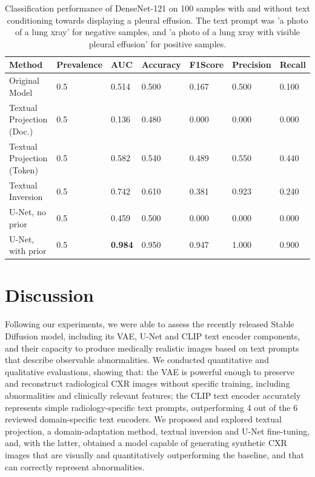 \documentclass{article}
\begin{document}
\begin{table}[]
\centering
\caption{Classification performance of DenseNet-121 on 100 samples with and without text conditioning towards displaying a pleural effusion. The text prompt was 'a photo of a lung xray' for negative samples, and 'a photo of a lung xray with visible pleural effusion' for positive samples.}
\label{table-generated-classification}
\begin{tabular}{@{}lllllll@{}}
\toprule
Method                      & Prevalence & AUC & Accuracy & F1Score & Precision & Recall \\ \midrule
Original Model               & 0.5        & 0.514 & 0.500    & 0.167   & 0.500     & 0.100  \\
Textual Projection (Doc.) & 0.5        & 0.136 & 0.480    & 0.000   & 0.000     & 0.000  \\
Textual Projection (Token) & 0.5        & 0.582 & 0.540    & 0.489   & 0.550     & 0.440  \\
Textual Inversion            & 0.5        & 0.742 & 0.610    & 0.381   & 0.923     & 0.240  \\
U-Net, no prior         & 0.5        & 0.459 & 0.500    & 0.000   & 0.000     & 0.000  \\
U-Net, with prior       & 0.5        & \textbf{0.984} & 0.950    & 0.947   & 1.000     & 0.900  \\ \bottomrule
\end{tabular}
\end{table}

\section{Discussion}

Following our experiments, we were able to assess the recently released Stable Diffusion model, including its VAE, U-Net and CLIP text encoder components, and their capacity to produce medically realistic images based on text prompts that describe observable abnormalities. We conducted quantitative and qualitative evaluations, showing that: the VAE is powerful enough to preserve and reconstruct radiological CXR images without specific training, including  abnormalities and clinically relevant features; the CLIP text encoder accurately represents simple radiology-specific text prompts, outperforming 4 out of the 6 reviewed domain-specific text encoders. We proposed and explored textual projection, a domain-adaptation method, textual inversion and U-Net fine-tuning, and, with the latter, obtained a model capable of generating synthetic CXR images that are visually and quantitatively outperforming the baseline, and that can correctly represent abnormalities. 
\end{document}
